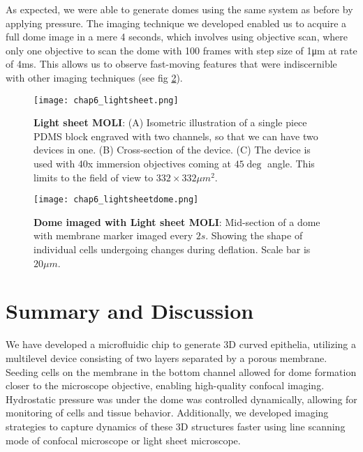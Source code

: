 As expected, we were able to generate domes using the same system as before by applying pressure. The imaging technique we developed enabled us to acquire a full dome image in a mere 4 seconds, which involves using objective scan, where only one objective to scan the dome with 100 frames with step size of 1\unit{\um} at rate of 4\unit{\ms}. This allows us to observe fast-moving features that were indiscernible with other imaging techniques (see fig \ref{fig_6_9}).

\begin{figure}[]
	\centering
	\texttt{[image: chap6\_lightsheet.png]}
	\caption{ \textbf{Light sheet MOLI}: (A) Isometric illustration of a single piece PDMS block engraved with two channels, so that we can have two devices in one. (B) Cross-section of the device. (C) The device is used with 40x immersion objectives coming at $45 \deg$ angle. This limits to the field of view to $332\times 332\mu m^2$.
	}\label{fig_6_8}
\end{figure}

\begin{figure}[]
	\centering
	\texttt{[image: chap6\_lightsheetdome.png]}
	\caption{ \textbf{Dome imaged with Light sheet MOLI}: Mid-section of a dome with membrane marker imaged every $2s$. Showing the shape of individual cells undergoing changes during deflation. Scale bar is $20 \mu m$.
	}\label{fig_6_9}
\end{figure}


\clearpage

\hypertarget{summary-and-discussion}{%
\section{Summary and Discussion}\label{summary-and-discussion}}

We have developed a microfluidic chip to generate 3D curved epithelia, utilizing a multilevel device consisting of two layers separated by a porous membrane. Seeding cells on the membrane in the bottom channel allowed for dome formation closer to the microscope objective, enabling high-quality confocal imaging. Hydrostatic pressure was under the dome was controlled dynamically, allowing for monitoring of cells and tissue behavior. Additionally, we developed imaging strategies to capture dynamics of these 3D structures faster using line scanning mode of confocal microscope or light sheet microscope.

